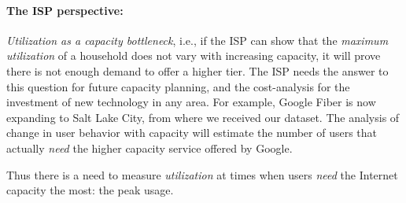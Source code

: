 \paragraph{The ISP perspective: }\emph{Utilization as a capacity bottleneck}, i.e., if
the ISP can show that the \emph{maximum utilization} of a household does not vary
with increasing capacity, it will prove there is not enough demand to offer a higher tier.  
The ISP needs the answer to this question for future capacity planning, and the cost-analysis
for the investment of new technology in any area.
For example, Google Fiber is now expanding to Salt Lake City, from where we received our dataset.
The analysis of change in user behavior with capacity will estimate the number of users that
actually \emph{need} the higher capacity service offered by Google.

Thus there is a need to measure \emph{utilization} at times when users \emph{need} the Internet
capacity the most: the peak usage.
